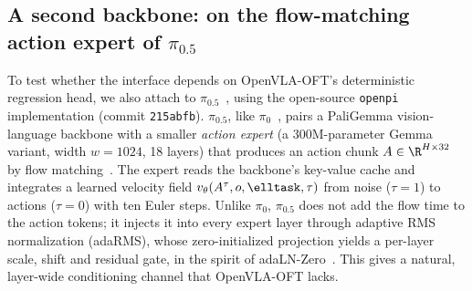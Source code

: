 \subsection{A second backbone: \meci on the flow-matching action expert of \texorpdfstring{$\pi_{0.5}$}{pi0.5}}
\label{sec:pi05}

To test whether the interface depends on OpenVLA-OFT's deterministic regression head, we also attach \meci to $\pi_{0.5}$~\citep{intelligence2025pi05}, using the open-source \texttt{openpi} implementation (commit \texttt{215abfb}). $\pi_{0.5}$, like $\pi_0$~\citep{black2024pi0}, pairs a PaliGemma vision-language backbone with a smaller \emph{action expert} (a 300M-parameter Gemma variant, width $w{=}1024$, 18 layers) that produces an action chunk $A\in\R^{H\times 32}$ by flow matching~\citep{lipman2023flowmatching}. The expert reads the backbone's key-value cache and integrates a learned velocity field $v_\theta(A^\tau, o, \elltask, \tau)$ from noise ($\tau{=}1$) to actions ($\tau{=}0$) with ten Euler steps. Unlike $\pi_0$, $\pi_{0.5}$ does not add the flow time to the action tokens; it injects it into every expert layer through adaptive RMS normalization (adaRMS), whose zero-initialized projection yields a per-layer scale, shift and residual gate, in the spirit of adaLN-Zero~\citep{peebles2023dit}. This gives a natural, layer-wide conditioning channel that OpenVLA-OFT lacks.


